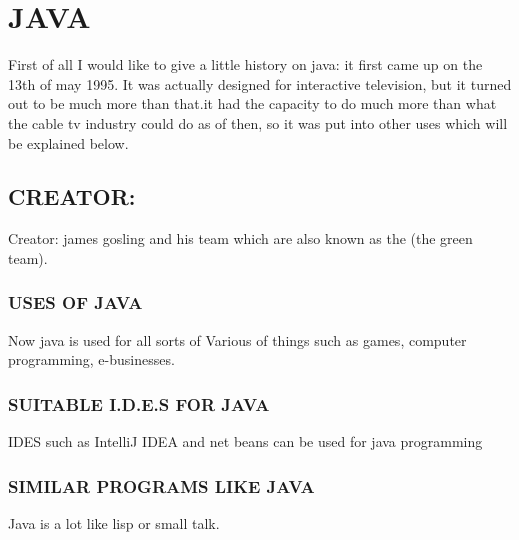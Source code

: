 \documentclass{article}
\begin{document}
	\section{JAVA}
	First of all I would like to give a little history on java: it first came up on the 13th of may 1995.
	 It was actually designed for interactive television, but it turned out to be much more than that.it had the capacity to do much more than what the cable tv industry could do as of then, so it was put into other uses which will be explained below.
	 \subsection{CREATOR:}
	Creator: james gosling and his team which are also known as the (the green team).
	\subsubsection{USES OF JAVA}
	Now java is used for all sorts of Various of things such as games, computer programming, e-businesses.
	\subsubsection{SUITABLE I.D.E.S FOR JAVA}
	IDES such as IntelliJ IDEA and net beans can be used for java programming 
	\subsubsection{SIMILAR PROGRAMS LIKE JAVA}
	Java is a lot like lisp or small talk.
\end{document}
